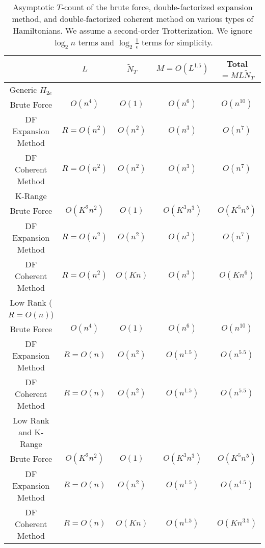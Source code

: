 \begin{table}[h!]
    \centering
    \renewcommand{\arraystretch}{1.25}
    \begin{tabular}{||c c c c c||} 
        \hline
         & $L$ & $\tilde{N}_T$ & $M = O(L^{1.5})$ & Total $= ML\tilde{N}_T$ \\
        \hline\hline
        Generic $H_{2e}$ & & & & \\
        \hline
        Brute Force & $O(n^4)$ & $O(1)$ & $O(n^6)$ & $O(n^{10})$ \\ 
        DF Expansion Method & $R = O(n^2)$ & $O(n^2)$ & $O(n^3)$ & $O(n^7)$ \\
        DF Coherent Method & $R = O(n^2)$ & $O(n^2)$ & $O(n^3)$ & $O(n^7)$ \\
        \hline\hline
        K-Range & & & & \\
        \hline
        Brute Force & $O(K^2n^2)$ & $O(1)$ & $O(K^3n^3)$ & $O(K^5n^5)$ \\ 
        DF Expansion Method & $R = O(n^2)$ & $O(n^2)$ & $O(n^3)$ & $O(n^7)$ \\
        DF Coherent Method & $R = O(n^2)$ & $O(Kn)$ & $O(n^3)$ & $O(Kn^6)$ \\
        \hline\hline
        Low Rank ($R = O(n)$) & & & & \\
        \hline
        Brute Force & $O(n^4)$ & $O(1)$ & $O(n^6)$ & $O(n^{10})$ \\ 
        DF Expansion Method & $R = O(n)$ & $O(n^2)$ & $O(n^{1.5})$ & $O(n^{5.5})$ \\
        DF Coherent Method & $R = O(n)$ & $O(n^2)$ & $O(n^{1.5})$ & $O(n^{5.5})$ \\
        \hline\hline
        Low Rank and K-Range & & & & \\
        \hline
        Brute Force & $O(K^2n^2)$ & $O(1)$ & $O(K^3n^3)$ & $O(K^5n^5)$ \\ 
        DF Expansion Method & $R = O(n)$ & $O(n^2)$ & $O(n^{1.5})$ & $O(n^{4.5})$ \\
        DF Coherent Method & $R = O(n)$ & $O(Kn)$ & $O(n^{1.5})$ & $O(Kn^{3.5})$ \\
        \hline
    \end{tabular}
    \caption{Asymptotic $T$-count of the brute force, double-factorized expansion method, and double-factorized coherent method on various types of Hamiltonians. We assume a second-order Trotterization. We ignore $\log_2{n}$ terms and $\log_2{\frac{1}{\epsilon}}$ terms for simplicity.}
    \label{table:1}
\end{table}

